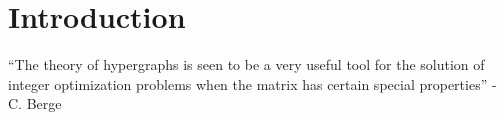 \chapter{Introduction}

``The theory of hypergraphs is seen to be a very useful tool for the solution of integer optimization problems when the matrix has certain special properties'' - C. Berge \cite{Hypergraph:Book}